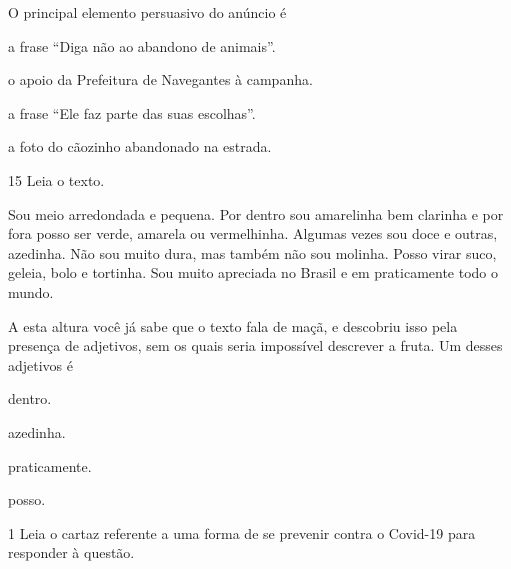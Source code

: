 O principal elemento persuasivo do anúncio é

\begin{escolha}
\item a frase ``Diga não ao abandono de animais''.

\item o apoio da Prefeitura de Navegantes à campanha.

\item a frase ``Ele faz parte das suas escolhas''.

\item a foto do cãozinho abandonado na estrada.
\end{escolha}


\num{15} Leia o texto.

\begin{myquote}
Sou meio arredondada e pequena. Por dentro sou amarelinha bem clarinha e
por fora posso ser verde, amarela ou vermelhinha. Algumas vezes sou doce
e outras, azedinha. Não sou muito dura, mas também não sou molinha.
Posso virar suco, geleia, bolo e tortinha. Sou muito apreciada no Brasil
e em praticamente todo o mundo.

A esta altura você já sabe que o texto fala de maçã, e descobriu isso
pela presença de adjetivos, sem os quais seria impossível descrever a
fruta. Um desses adjetivos é
\end{myquote}

\begin{escolha}
\item dentro.

\item azedinha.

\item praticamente.

\item posso.
\end{escolha}

\vspace*{-3.4cm}

\num{1} Leia o cartaz referente a uma forma de se prevenir contra o Covid-19
para responder à questão.


